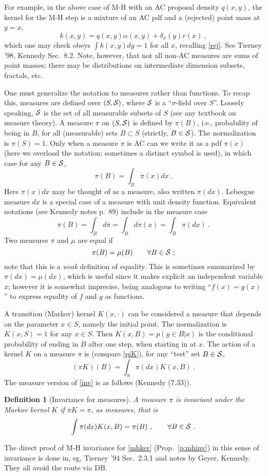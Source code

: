 \documentclass[10pt]{article}
\newcommand{\be}{\begin{equation}}
\newcommand{\ee}{\end{equation}}
\newtheorem{dfn}[thm]{Definition}
\newcommand{\al}{\alpha}
\begin{document}
For example, in the above case of M-H with an AC proposal density
$q(x,y)$, the kernel for the M-H step
is a mixture of an AC pdf and a (rejected) point mass at $y=x$,
\be
k(x,y) = q(x,y)\al(x,y) + \delta_x(y) r(x)~,
\label{mhker}
\ee
which one may check obeys $\int k(x,y) dy=1$ for all $x$,
recalling \eqref{rej}.
See Tierney '98, Kennedy Sec.~8.2.
Note, however, that not all non-AC measures are sums of point masses;
there may be distributions on intermediate dimension subsets, fractals, etc.

One must generalize the notation to measures rather than
functions.
To recap this,
measures are defined over $(S,\cal S)$, where $\cal S$ is a
``$\sigma$-field over $S$''.
Loosely speaking, $\cal S$ is the set of all measurable
subsets of $S$ (see any textbook on measure theory).
A measure $\pi$ on $(S,\cal S)$ is defined by
$\pi(B)$, i.e., probability of being in $B$,
for all (measurable) sets $B\subset S$ (strictly, $B\in \cal S$).
The normalization is $\pi(S) = 1$.
Only when a measure $\pi$ is AC
can we write it as a pdf $\pi(x)$
(here we overload the notation; sometimes a distinct symbol is used),
in which case for any $B\in\cal S$,
$$
\pi(B) = \int_B \pi(x) dx~.
$$
Here $\pi(x) dx$ may be thought of as a measure, also written
$\pi(dx)$.
Lebesgue measure $dx$ is a special case of a measure with unit density function.
Equivalent notations (see Kennedy notes p.~89) include in the measure case
$$
\pi(B) = \int_B d\pi = \int_B d\pi(x) = \int_B \pi(dx) ~.
$$
Two measures $\pi$ and $\mu$ are equal if
$$
\pi(B) = \mu(B) \qquad \forall B\in\cal S~;
$$
note that this is a {\em weak} definition of equality.
This is sometimes summarized by $\pi(dx) = \mu(dx)$, which
is useful since it makes explicit an independent variable $x$;
however it is somewhat imprecise, being analogous to
writing ``$f(x) = g(x)$'' to express equality of $f$ and $g$ as functions.

A transition (Markov) kernel $K(x,\cdot)$ can be considered a measure
that depends on the parameter $x\in S$, namely the initial point.
The normalization is $K(x,S)=1$ for any $x\in S$.
Then $K(x,B) = p(y\in B | x)$ is the conditional probability of ending in
$B$ after one step, when starting in at $x$.
The action of a kernel $K$ on a measure $\pi$ is
(compare \eqref{piK}),
for any ``test'' set $B \in \cal S$,
$$
(\pi K)(B) = \int_S \pi(dx) K(x,B)~.
$$
The measure version of \eqref{inv} is as follows (Kennedy (7.33)).
\begin{dfn}[Invariance for measures]
  A measure $\pi$ is invariant under the Markov kernel $K$ if
  $\pi K = \pi$, as measures, that is
  \be
  \int \pi(dx) K(x,B) = \pi(B) ~, \qquad \forall B \in \cal S~.
  \ee
  \label{d:invm}
\end{dfn}
The direct proof of M-H invariance for \eqref{mhker} (Prop.~\ref{p:mhinv})
in this sense of invariance is
done in, eg, Tierney '94 Sec.~2.3.1 and notes by Geyer, Kennedy.
They all avoid the route via DB.
\end{document}
